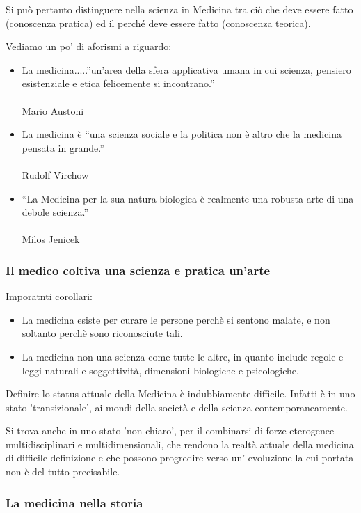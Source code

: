   Si può pertanto distinguere nella scienza in Medicina tra ciò che deve
  essere fatto (conoscenza pratica) ed il perché deve essere fatto
  (conoscenza teorica).

  Vediamo un po' di aforismi a riguardo:
  \begin{itemize}
\item
  La medicina.....''un'area della sfera applicativa umana in cui
  scienza, pensiero esistenziale e etica felicemente si incontrano.''
\\\\
  Mario Austoni
\item
  La medicina è ``una scienza sociale e la politica non è altro che la
  medicina pensata in grande.''
\\\\
  Rudolf Virchow
\item
  ``La Medicina per la sua natura biologica è realmente una robusta arte
  di una debole scienza.''
\\\\
  Milos Jenicek
\end{itemize}

  \subsubsection{Il medico coltiva una scienza e pratica un'arte}

  Imporatnti corollari:
  
\begin{itemize}
\item
  La medicina esiste per curare le persone perchè si sentono malate, e
  non soltanto perchè sono riconosciute tali.
\item
  La medicina non una scienza come tutte le altre, in quanto include
  regole e leggi naturali e soggettività, dimensioni biologiche e
  psicologiche.
\end{itemize}

  Definire lo status attuale della Medicina è indubbiamente difficile.
  Infatti è in uno stato 'transizionale', ai mondi della società e della
  scienza contemporaneamente.

  Si trova anche in uno stato 'non chiaro', per il combinarsi di forze
  eterogenee multidisciplinari e multidimensionali, che rendono la
  realtà attuale della medicina di difficile definizione e che possono
  progredire verso un' evoluzione la cui portata non è del tutto
  precisabile.

  \subsubsection{La medicina nella storia}

